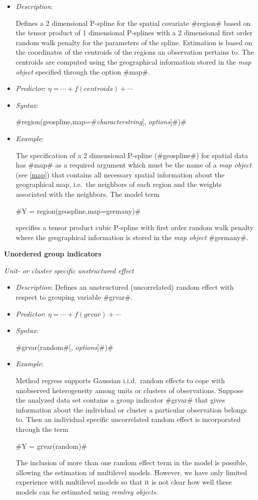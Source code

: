 \begin{itemize}
\item[] {\em Description}:

Defines a 2 dimensional P-spline for the spatial covariate
#region# based on the tensor product of 1 dimensional P-splines
with a 2 dimensional first order random walk penalty for the
parameters of the spline. Estimation is based on the coordinates
of the centroids of the regions an observation pertains to. The
centroids are computed using the geographical information stored
in the {\em map object} specified through the option #map#.
\item[] {\em Predictor}: $\eta= \cdots + f(centroids) + \cdots$
\item[] {\em Syntax}:

#region(geospline,map=#{\em characterstring}[, {\em options}]#)#
\item[] {\em Example}:

The specification of a 2 dimensional P-spline  (#geospline#) for
spatial data has #map# as a required argument which must be the
name of a {\em map object} (see \autoref{map}) that contains all
necessary spatial information about the geographical map, i.e.~the
neighbors of each region and the weights associated with the
neighbors. The model term

#Y = region(geospline,map=germany)#

specifies a tensor product cubic P-spline with first order random
walk penalty where the geographical information is stored in the
{\em map object} #germany#.
\end{itemize}

\vspace{0.5cm}

{\bf Unordered group indicators}
\medskip

{\em Unit- or cluster specific unstructured effect}

\begin{itemize}
\item[] {\em Description}: Defines an unstructured (uncorrelated) random effect with respect
to grouping variable #grvar#.
\item[] {\em Predictor}: $\eta = \cdots + f(grvar) + \cdots$
\item[] {\em Syntax}:

#grvar(random#[, {\em options}]#)#
\item[] {\em Example}:

Method regress supports Gaussian i.i.d.~random effects to cope
with unobserved heterogeneity among units or clusters of
observations. Suppose the analyzed data set contains a group
indicator #grvar# that gives information about the individual or
cluster a particular observation belongs to. Then an individual
specific uncorrelated random effect is incorporated through the
term

#Y = grvar(random)#

The inclusion of more than one random effect term in the model is
possible, allowing the estimation of multilevel models. However,
we have only limited experience with multilevel models so that it
is not clear how well these models can be estimated using {\em
remlreg objects}.
\end{itemize}


